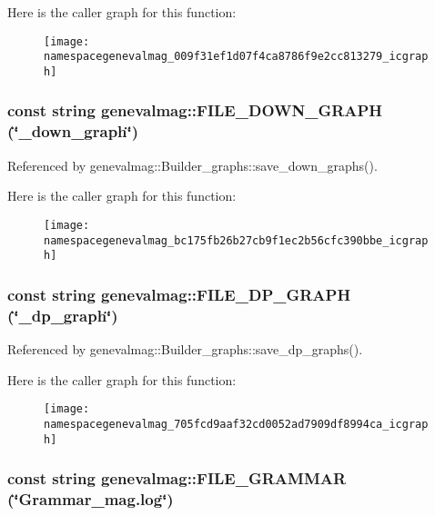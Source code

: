 Here is the caller graph for this function:\nopagebreak
\begin{figure}[H]
\begin{center}
\leavevmode
\texttt{[image: namespacegenevalmag\_009f31ef1d07f4ca8786f9e2cc813279\_icgraph]}
\end{center}
\end{figure}
\hypertarget{namespacegenevalmag_bc175fb26b27cb9f1ec2b56cfc390bbe}{
\subsubsection[{FILE\_\-DOWN\_\-GRAPH}]{\setlength{\rightskip}{0pt plus 5cm}const string genevalmag::FILE\_\-DOWN\_\-GRAPH (\char`\"{}\_\-down\_\-graph\char`\"{})}}
\label{namespacegenevalmag_bc175fb26b27cb9f1ec2b56cfc390bbe}




Referenced by genevalmag::Builder\_\-graphs::save\_\-down\_\-graphs().

Here is the caller graph for this function:\nopagebreak
\begin{figure}[H]
\begin{center}
\leavevmode
\texttt{[image: namespacegenevalmag\_bc175fb26b27cb9f1ec2b56cfc390bbe\_icgraph]}
\end{center}
\end{figure}
\hypertarget{namespacegenevalmag_705fcd9aaf32cd0052ad7909df8994ca}{
\subsubsection[{FILE\_\-DP\_\-GRAPH}]{\setlength{\rightskip}{0pt plus 5cm}const string genevalmag::FILE\_\-DP\_\-GRAPH (\char`\"{}\_\-dp\_\-graph\char`\"{})}}
\label{namespacegenevalmag_705fcd9aaf32cd0052ad7909df8994ca}




Referenced by genevalmag::Builder\_\-graphs::save\_\-dp\_\-graphs().

Here is the caller graph for this function:\nopagebreak
\begin{figure}[H]
\begin{center}
\leavevmode
\texttt{[image: namespacegenevalmag\_705fcd9aaf32cd0052ad7909df8994ca\_icgraph]}
\end{center}
\end{figure}
\hypertarget{namespacegenevalmag_dd88c73415b1eb5c506b9d66b294b7cf}{
\subsubsection[{FILE\_\-GRAMMAR}]{\setlength{\rightskip}{0pt plus 5cm}const string genevalmag::FILE\_\-GRAMMAR (\char`\"{}Grammar\_\-mag.log\char`\"{})}}
\label{namespacegenevalmag_dd88c73415b1eb5c506b9d66b294b7cf}




